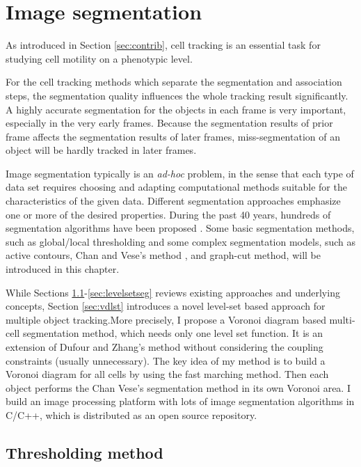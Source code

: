 \chapter{Image segmentation} \label{chpt:imgseg}
As introduced in Section \ref{sec:contrib}, cell tracking is an essential task for studying cell motility on a phenotypic level.

For the cell tracking methods which separate the segmentation and association steps, the segmentation quality influences the whole tracking result significantly. A highly accurate segmentation for the objects in each frame is very important, especially in the very early frames. Because the segmentation results of prior frame affects the segmentation results of later frames, miss-segmentation of an object will be hardly tracked in later frames.

Image segmentation typically is an \emph{ad-hoc} problem, in the sense that each type of data set requires choosing and adapting computational methods suitable for the characteristics of the given data. Different segmentation approaches emphasize one or more of the desired properties. During the past 40 years, hundreds of segmentation algorithms have been proposed \cite{freixenet2002yet}. Some basic segmentation methods, such as global/local thresholding and some complex segmentation models, such as active contours, Chan and Vese's method , and graph-cut method, will be introduced in this chapter.

While Sections \ref{sec:thresh_method}-\ref{sec:levelsetseg} reviews existing approaches and underlying concepts, Section \ref{sec:vdlst} introduces a novel level-set based approach for multiple object tracking.More precisely, I propose a Voronoi diagram based multi-cell segmentation method, which needs only one level set function. It is an extension of Dufour \cite{dufour2005segmenting} and Zhang's method \cite{zhang2004tracking} without considering the coupling constraints (usually unnecessary). The key idea of my method is to build a Voronoi diagram for all cells by using the fast marching method. Then each object performs the Chan Vese's segmentation method in its own Voronoi area. I build an image processing platform with lots of image segmentation algorithms in C/C++, which is distributed as an open source repository.
\section{Thresholding method} \label{sec:thresh_method}
